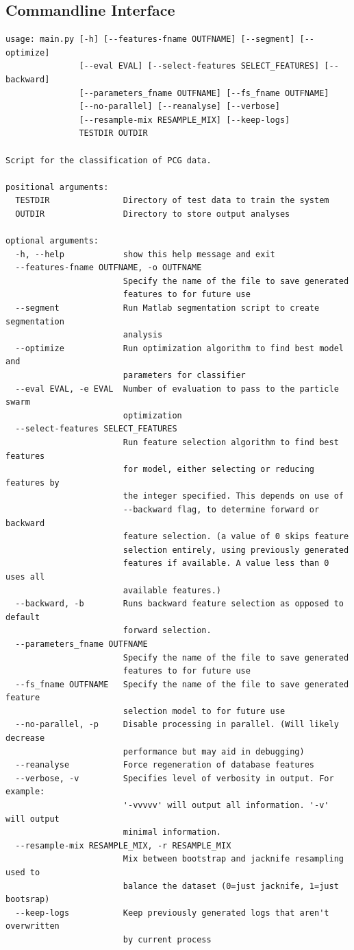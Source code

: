 \documentclass[titlepage, 12pt]{scrartcl} \usepackage{enumitem}
\begin{document}
\subsection{Commandline Interface}
\begin{lstlisting}[numbers=none]
usage: main.py [-h] [--features-fname OUTFNAME] [--segment] [--optimize]
               [--eval EVAL] [--select-features SELECT_FEATURES] [--backward]
               [--parameters_fname OUTFNAME] [--fs_fname OUTFNAME]
               [--no-parallel] [--reanalyse] [--verbose]
               [--resample-mix RESAMPLE_MIX] [--keep-logs]
               TESTDIR OUTDIR

Script for the classification of PCG data.

positional arguments:
  TESTDIR               Directory of test data to train the system
  OUTDIR                Directory to store output analyses

optional arguments:
  -h, --help            show this help message and exit
  --features-fname OUTFNAME, -o OUTFNAME
                        Specify the name of the file to save generated
                        features to for future use
  --segment             Run Matlab segmentation script to create segmentation
                        analysis
  --optimize            Run optimization algorithm to find best model and
                        parameters for classifier
  --eval EVAL, -e EVAL  Number of evaluation to pass to the particle swarm
                        optimization
  --select-features SELECT_FEATURES
                        Run feature selection algorithm to find best features
                        for model, either selecting or reducing features by
                        the integer specified. This depends on use of
                        --backward flag, to determine forward or backward
                        feature selection. (a value of 0 skips feature
                        selection entirely, using previously generated
                        features if available. A value less than 0 uses all
                        available features.)
  --backward, -b        Runs backward feature selection as opposed to default
                        forward selection.
  --parameters_fname OUTFNAME
                        Specify the name of the file to save generated
                        features to for future use
  --fs_fname OUTFNAME   Specify the name of the file to save generated feature
                        selection model to for future use
  --no-parallel, -p     Disable processing in parallel. (Will likely decrease
                        performance but may aid in debugging)
  --reanalyse           Force regeneration of database features
  --verbose, -v         Specifies level of verbosity in output. For example:
                        '-vvvvv' will output all information. '-v' will output
                        minimal information.
  --resample-mix RESAMPLE_MIX, -r RESAMPLE_MIX
                        Mix between bootstrap and jacknife resampling used to
                        balance the dataset (0=just jacknife, 1=just bootsrap)
  --keep-logs           Keep previously generated logs that aren't overwritten
                        by current process
\end{lstlisting}


\pagebreak{}
\printbibliography{}
\end{document}

